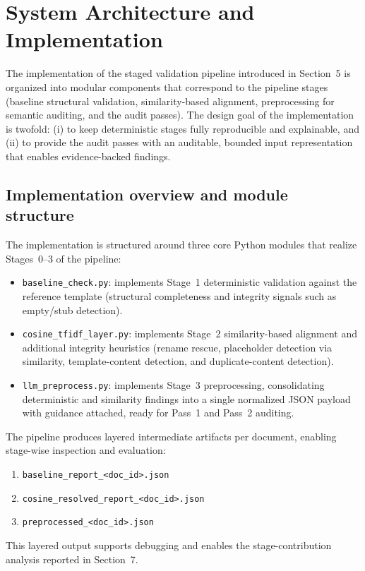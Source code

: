 \section{System Architecture and Implementation}
The implementation of the staged validation pipeline introduced in Section~5 is organized into modular components that correspond to the pipeline stages (baseline structural validation, similarity-based alignment, preprocessing for semantic auditing, and the audit passes). The design goal of the implementation is twofold: (i) to keep deterministic stages fully reproducible and explainable, and (ii) to provide the audit passes with an auditable, bounded input representation that enables evidence-backed findings.

\subsection{Implementation overview and module structure}
The implementation is structured around three core Python modules that realize Stages~0--3 of the pipeline:

\begin{itemize}
    \item \texttt{baseline\_check.py}: implements Stage~1 deterministic validation against the reference template (structural completeness and integrity signals such as empty/stub detection).
    \item \texttt{cosine\_tfidf\_layer.py}: implements Stage~2 similarity-based alignment and additional integrity heuristics (rename rescue, placeholder detection via similarity, template-content detection, and duplicate-content detection).
    \item \texttt{llm\_preprocess.py}: implements Stage~3 preprocessing, consolidating deterministic and similarity findings into a single normalized JSON payload with guidance attached, ready for Pass~1 and Pass~2 auditing.
\end{itemize}

The pipeline produces layered intermediate artifacts per document, enabling stage-wise inspection and evaluation:
\begin{enumerate}
    \item \texttt{baseline\_report\_\textless doc\_id\textgreater.json}
    \item \texttt{cosine\_resolved\_report\_\textless doc\_id\textgreater.json}
    \item \texttt{preprocessed\_\textless doc\_id\textgreater.json}
\end{enumerate}
This layered output supports debugging and enables the stage-contribution analysis reported in Section~7.

